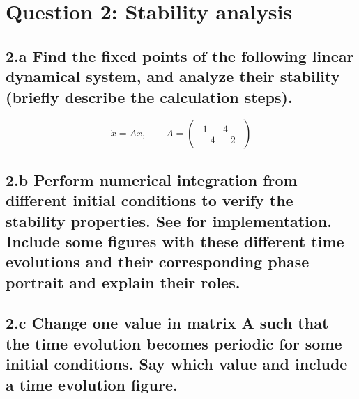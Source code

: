 \documentclass{cmc}
\begin{document}
\vspace{0.3\textheight}



\clearpage

\section*{Question 2: Stability analysis}

\subsection*{2.a Find the fixed points of the following linear dynamical system,
  and analyze their stability (briefly describe the calculation steps).}

\begin{equation}
  \label{eq:system}
  \dot{x} = A x,
  \qquad
  A =
  \begin{pmatrix}
    \begin{array}{rr}
      1 & 4 \\
      -4 & -2
    \end{array}
  \end{pmatrix}
\end{equation}



\vspace{0.3\textheight}



\clearpage

\subsection*{2.b Perform numerical integration from different initial conditions
  to verify the stability properties. See 
  for implementation. Include some figures with these different time evolutions
  and their corresponding phase portrait and explain their roles.}


\clearpage

\subsection*{2.c Change one value in matrix A such that the time evolution
  becomes periodic for some initial conditions. Say which value and include a
  time evolution figure.}



\vspace{0.3\textheight}
\end{document}
